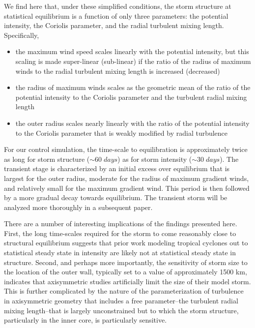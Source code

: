\documentclass[12pt]{article}
\begin{document}
We find here that, under these simplified conditions, the storm structure at statistical equilibrium is a function of only three parameters: the potential intensity, the Coriolis parameter, and the radial turbulent mixing length. Specifically,
\begin{itemize}
	\item the maximum wind speed scales linearly with the potential intensity, but this scaling is made super-linear (sub-linear) if the ratio of the radius of maximum winds to the radial turbulent mixing length is increased (decreased) 
	\item the radius of maximum winds scales as the geometric mean of the ratio of the potential intensity to the Coriolis parameter and the turbulent radial mixing length
	\item the outer radius scales nearly linearly with the ratio of the potential intensity to the Coriolis parameter that is weakly modified by radial turbulence
\end{itemize}
For our control simulation, the time-scale to equilibration is approximately twice as long for storm structure ($\sim 60 \; days$) as for storm intensity ($\sim 30 \; days$). The transient stage is characterized by an initial excess over equilibrium that is largest for the outer radius, moderate for the radius of maximum gradient winds, and relatively small for the maximum gradient wind. This period is then followed by a more gradual decay towards equilibrium.  The transient storm will be analyzed more thoroughly in a subsequent paper.

There are a number of interesting implications of the findings presented here.  First, the long time-scales required for the storm to come reasonably close to structural equilibrium suggests that prior work modeling tropical cyclones out to statistical steady state in intensity are likely not at statistical steady state in structure.  Second, and perhaps more importantly, the sensitivity of storm size to the location of the outer wall, typically set to a value of approximately 1500 km, indicates that axisymmetric studies artificially limit the size of their model storm. This is further complicated by the nature of the parameterization of turbulence in axisymmetric geometry that includes a free parameter--the turbulent radial mixing length--that is largely unconstrained but to which the storm structure, particularly in the inner core, is particularly sensitive.

\end{document}
